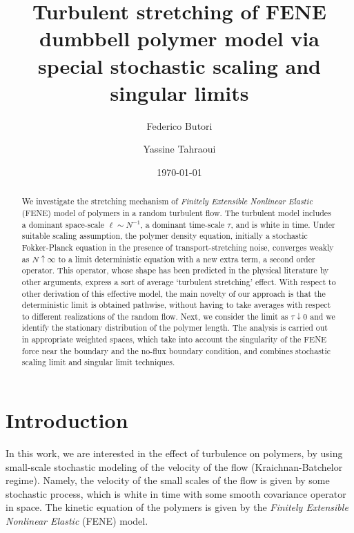 \documentclass[a4paper,12pt, reqno]{amsart}
\title[Turbulent stretching of FENE polymers via  stochastic scaling $\&$ singular limits]
{Turbulent stretching of FENE dumbbell polymer model via special stochastic scaling and singular limits}
\author[Federico Butori]{Federico Butori}
\author[Yassine Tahraoui]{Yassine Tahraoui}
\date\today
\begin{document}
	\begin{abstract}
    We investigate  the stretching mechanism of \textit{Finitely Extensible Nonlinear Elastic} (FENE) model of polymers in a random turbulent flow. The turbulent model includes a   dominant  space-scale $\ell\sim N^{-1}$, a dominant time-scale $\tau$, and is white in time. Under suitable scaling assumption,  the polymer density equation, initially a stochastic  Fokker-Planck equation in the presence  of transport-stretching noise, converges weakly  as $N\uparrow \infty$ to a limit deterministic equation with a new extra term, a second order operator. This operator, whose shape has been predicted in the physical literature by other arguments, express a sort of average `turbulent stretching' effect. With respect to other derivation of this effective model, the main novelty of our approach is that the deterministic limit is obtained pathwise, without having to take averages with respect to different realizations of the random flow.
    Next, we consider the limit as $\tau \downarrow 0$ and we identify the stationary distribution of the polymer length. The analysis is carried out in appropriate weighted spaces, which take into account the singularity of the FENE force near the boundary and the no-flux boundary condition, and combines stochastic scaling limit and singular limit techniques.    \end{abstract}
	\maketitle
\tableofcontents

\section{Introduction}

In this work, we are interested in the effect of turbulence on polymers, by using small-scale stochastic modeling  of the velocity of the flow (Kraichnan-Batchelor regime).  Namely, the velocity of the small scales of the  flow is given by some stochastic process, which is  white in time  with some  smooth covariance operator in space. The  kinetic equation of the polymers  is given by the \textit{Finitely Extensible Nonlinear Elastic} (FENE) model.\\
\end{document}
